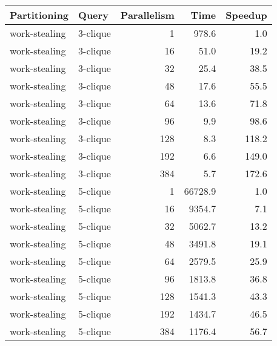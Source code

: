 \begin{tabular}{llr|rr}
\toprule
  Partitioning &     Query &  Parallelism &     Time &  Speedup \\
\midrule
 work-stealing &  3-clique &            1 &    978.6 &      1.0 \\
 work-stealing &  3-clique &           16 &     51.0 &     19.2 \\
 work-stealing &  3-clique &           32 &     25.4 &     38.5 \\
 work-stealing &  3-clique &           48 &     17.6 &     55.5 \\
 work-stealing &  3-clique &           64 &     13.6 &     71.8 \\
 work-stealing &  3-clique &           96 &      9.9 &     98.6 \\
 work-stealing &  3-clique &          128 &      8.3 &    118.2 \\
 work-stealing &  3-clique &          192 &      6.6 &    149.0 \\
 work-stealing &  3-clique &          384 &      5.7 &    172.6 \\
 work-stealing &  5-clique &            1 &  66728.9 &      1.0 \\
 work-stealing &  5-clique &           16 &   9354.7 &      7.1 \\
 work-stealing &  5-clique &           32 &   5062.7 &     13.2 \\
 work-stealing &  5-clique &           48 &   3491.8 &     19.1 \\
 work-stealing &  5-clique &           64 &   2579.5 &     25.9 \\
 work-stealing &  5-clique &           96 &   1813.8 &     36.8 \\
 work-stealing &  5-clique &          128 &   1541.3 &     43.3 \\
 work-stealing &  5-clique &          192 &   1434.7 &     46.5 \\
 work-stealing &  5-clique &          384 &   1176.4 &     56.7 \\
\bottomrule
\end{tabular}

